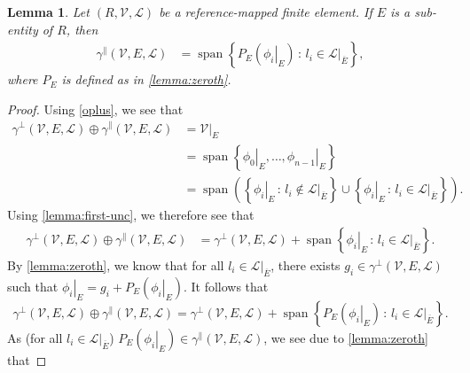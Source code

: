 \documentclass[sn-mathphys-num]{sn-jnl}%
\theoremstyle{thmstyleone}%
\newtheorem{lemma}{Lemma}%
\newcommand{\closure}[1]{\overline{#1}}
\newcommand{\subentity}{E}
\newcommand{\refel}{R}
\newcommand{\polyspace}{\mathcal{V}}
\newcommand{\dualbasis}{\mathcal{L}}
\newcommand{\unctrace}[3]{\gamma^\perp(#1,#2,#3)}
\newcommand{\ctrace}[3]{\gamma^\parallel(#1,#2,#3)}
\theoremstyle{thmstyletwo}%
\theoremstyle{thmstylethree}%
\begin{document}
\begin{lemma}\label{lemma:first-c}
Let $(\refel,\polyspace,\dualbasis)$ be a reference-mapped finite element.
If $\subentity$ is a sub-entity of $\refel$, then
\begin{align*}
\ctrace{\polyspace}{\subentity}{\dualbasis} &=
\operatorname{span}\left\{P_{\subentity}\left(\left.\phi_i\right|_{\subentity}\right)
\,:\,l_i\in\left.\dualbasis\right|_{\closure{\subentity}}\right\},
\end{align*}
where \(P_{\subentity}\) is defined as in \cref{lemma:zeroth}.
\end{lemma}
\begin{proof}
Using \cref{oplus}, we see that
\begin{align*}
\unctrace{\polyspace}{\subentity}{\dualbasis}\oplus\ctrace{\polyspace}{\subentity}{\dualbasis}
&=\left.\polyspace\right|_{\subentity}\\
&=
\operatorname{span}\left\{\left.\phi_0\right|_{\subentity},\dots,\left.\phi_{n-1}\right|_{\subentity}\right\}\\
&=
\operatorname{span}\left(\left\{\left.\phi_i\right|_{\subentity}\,:\,l_i\not\in\left.\dualbasis\right|_{\closure{\subentity}}\right\}
\cup
\left\{\left.\phi_i\right|_{\subentity}\,:\,l_i\in\left.\dualbasis\right|_{\closure{\subentity}}\right\}\right).
\end{align*}
Using \cref{lemma:first-unc}, we therefore see that
\begin{align*}
\unctrace{\polyspace}{\subentity}{\dualbasis}\oplus\ctrace{\polyspace}{\subentity}{\dualbasis}
&=
\unctrace{\polyspace}{\subentity}{\dualbasis}
+
\operatorname{span}\left\{\left.\phi_i\right|_{\subentity}\,:\,l_i\in\left.\dualbasis\right|_{\closure{\subentity}}\right\}.
\end{align*}
By \cref{lemma:zeroth}, we know that for all $l_i\in\left.\dualbasis\right|_{\closure{\subentity}}$,
there exists $g_i\in\unctrace{\polyspace}{\subentity}{\dualbasis}$ such that
\(\left.\phi_i\right|_{\subentity}=g_i+P_{\subentity}\left(\left.\phi_i\right|_{\subentity}
\right)\). It follows that
\begin{equation}
\unctrace{\polyspace}{\subentity}{\dualbasis}\oplus\ctrace{\polyspace}{\subentity}{\dualbasis}
=
\unctrace{\polyspace}{\subentity}{\dualbasis}
+
\operatorname{span}\left\{P_{\subentity}\left(\left.\phi_i\right|_{\subentity}\right)\,:\,l_i\in\left.\dualbasis\right|_{\closure{\subentity}}\right\}.
\label{eq:first-sum}\end{equation}
As (for all $l_i\in\left.\dualbasis\right|_{\closure{\subentity}}$) $P_{\subentity}\left(\left.\phi_i\right|_{\subentity}\right)\in\ctrace{\polyspace}{\subentity}{\dualbasis}$, we see due to \cref{lemma:zeroth} that 

\end{proof}
\end{document}
